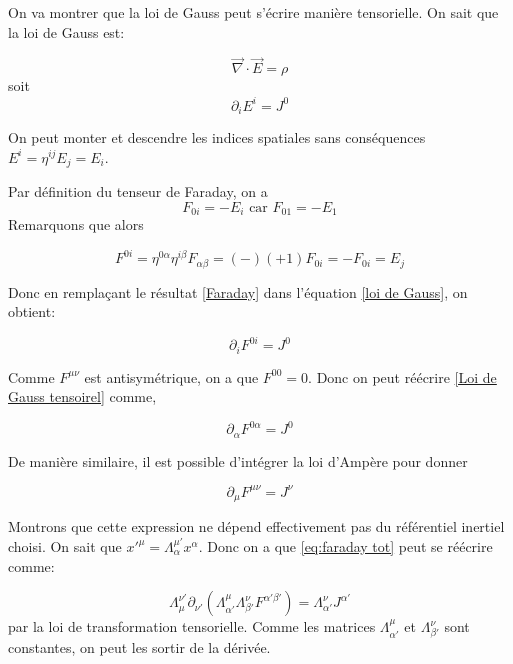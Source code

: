 On va montrer que la loi de Gauss peut s'écrire manière tensorielle.
On sait que la loi de Gauss est:

\begin{equation}
    \Vec{\nabla}\cdot \Vec{E} = \rho
\end{equation}
soit
\begin{equation}
    \partial_{i}E^{i} = J^{0}
    \label{loi de Gauss}
\end{equation}
\begin{rmk}
     On peut monter et descendre les indices spatiales sans conséquences $E^{i} = \eta^{ij}E_{j} = E_{i}$.
\end{rmk}

Par définition du tenseur de Faraday, on a
\begin{equation}
    F_{0i} = -E_i \text{ car } F_{01} = -E_1
\end{equation}
Remarquons que alors

\begin{equation}
    F^{0i} = \eta ^{0 \alpha} \eta ^{i\beta} F_{\alpha \beta} = (-)(+1)F_{0i} = -F_{0i} = E_j
    \label{Faraday}
\end{equation}

Donc en remplaçant le résultat \ref{Faraday} dans l'équation \ref{loi de Gauss}, on obtient:

\begin{equation}
    \partial_{i}F^{0i} = J^0
    \label{Loi de Gauss tensoirel}
\end{equation}

Comme $F^{\mu \nu}$ est antisymétrique, on a que $F^{00} = 0$. Donc on peut réécrire \ref{Loi de Gauss tensoirel} comme,

\begin{equation}
    \partial_{\alpha}F^{0\alpha} = J^0
\end{equation}

De manière similaire, il est possible d'intégrer la loi d'Ampère pour donner

\begin{equation}
    \label{eq:faraday tot}
    \partial_{\mu}F^{\mu\nu} = J^{\nu}
\end{equation}

Montrons que cette expression ne dépend effectivement pas du référentiel inertiel choisi. On sait que $x'^{\mu} = \Lambda^{\mu'}_{\alpha}x^{\alpha}$.
Donc on a que \ref{eq:faraday tot} peut se réécrire comme:

\begin{equation}
   \Lambda^{\nu '}_{\mu} \partial_{\nu '}(\Lambda ^{\mu}_{\alpha'}\Lambda ^{\nu}_{\beta '}F^{\alpha ' \beta '} ) =  \Lambda^{\nu }_{\alpha'}J^{\alpha '}
\end{equation}
par la loi de transformation tensorielle. Comme les matrices $\Lambda ^{\mu}_{\alpha'}$ et $\Lambda ^{\nu}_{\beta '}$ sont constantes, on peut les sortir de la dérivée. 

